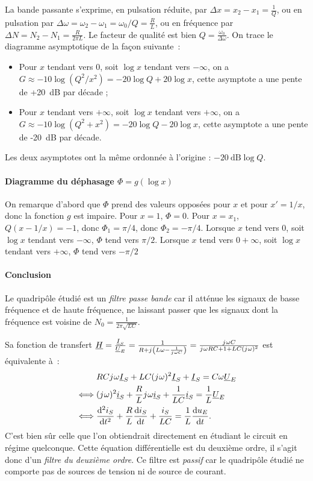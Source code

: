 La bande passante s'exprime, en pulsation réduite, par \(\Delta x = x_2 - x_1 = \frac{1}{Q}\), ou en pulsation par \(\Delta \omega = \omega_2 - \omega_1 = \omega_0/Q = \frac{R}{L}\), ou en fréquence par \(\Delta N = N_2- N_1 = \frac{R}{2\pi L}\). Le facteur de qualité est bien \(Q = \frac{\omega_0}{\Delta \omega}\). On trace le diagramme asymptotique de la façon suivante~:
\begin{itemize}
	\item Pour \(x\) tendant vers \(0\), soit \(\log x\) tendant vers \(-\infty\), on a \(G \approx -10\log(Q^2/x^2) = -20\log Q +20\log x\), cette asymptote a une pente de +\SI{20}{\dB} par décade ;
	\item Pour \(x\) tendant vers \(+\infty\), soit \(\log x\) tendant vers \(+\infty\), on a \(G \approx -10\log(Q^2+x^2) = -20\log Q -20\log x\), cette asymptote a une pente de -\SI{20}{\dB} par décade.
\end{itemize}
Les deux asymptotes ont la même ordonnée à l'origine : \(-\SI{20}{\dB}\log Q\).
\paragraph{Diagramme du déphasage \(\Phi = g(\log x)\)}

On remarque d'abord que \(\Phi\) prend des valeurs opposées pour \(x\) et pour \(x'=1/x\), donc la fonction \(g\) est impaire. Pour \(x=1\), \(\Phi = 0\). Pour \(x=x_1\), \(Q(x-1/x)=-1\), donc \(\Phi_1=\pi/4\), donc \(\Phi_2=-\pi/4\). Lorsque \(x\) tend vers \(0\), soit \(\log x\) tendant vers \(-\infty\), \(\Phi\) tend vers \(\pi/2\). Lorsque \(x\) tend vers \(0+\infty\), soit \(\log x\) tendant vers \(+\infty\), \(\Phi\) tend vers \(-\pi/2\)
\paragraph{Conclusion}

Le quadripôle étudié est un \emph{filtre passe bande} car il atténue les signaux de basse fréquence et de haute fréquence, ne laissant passer que les signaux dont la fréquence est voisine de \(N_0 = \frac{1}{2\pi\sqrt{LC}}\).

Sa fonction de transfert \(\underline{H} = \frac{\underline{I}_S}{\underline{U}_E} = \frac{1}{R+{j\mkern1mu}\left( L\omega -\frac{1}{{j\mkern1mu} \omega C} \right)} = \frac{{j\mkern1mu} \omega C}{{j\mkern1mu} \omega R C + 1 +LC ({j\mkern1mu} \omega)^2}\) est équivalente à~:
\begin{align}
	& RC {j\mkern1mu} \omega \underline{I}_S + LC ({j\mkern1mu} \omega)^2 \underline{I}_S + \underline{I}_S = C \omega \underline{U}_E \\
	\iff & ({j\mkern1mu} \omega)^2 \underline{i}_S + \frac{R}{L} {j\mkern1mu}\omega \underline{i}_S + \frac{1}{LC} \underline{i}_S = \frac{1}{L} \underline{U}_E \\
	\iff & \dfrac{\mathrm{d}^2 i_S}{\mathrm{d} {t}^2} + \frac{R}{L} \dfrac{\mathrm{d} i_S}{\mathrm{d} t} + \frac{i_S}{LC} = \frac{1}{L} \dfrac{\mathrm{d} u_E}{\mathrm{d} t}.
\end{align}
C'est bien sûr celle que l'on obtiendrait directement en étudiant le circuit en régime quelconque. Cette équation différentielle est du deuxième ordre, il s'agit donc d'un \emph{filtre du deuxième ordre}. Ce filtre est \emph{passif} car le quadripôle étudié ne comporte pas de sources de tension ni de source de courant.

